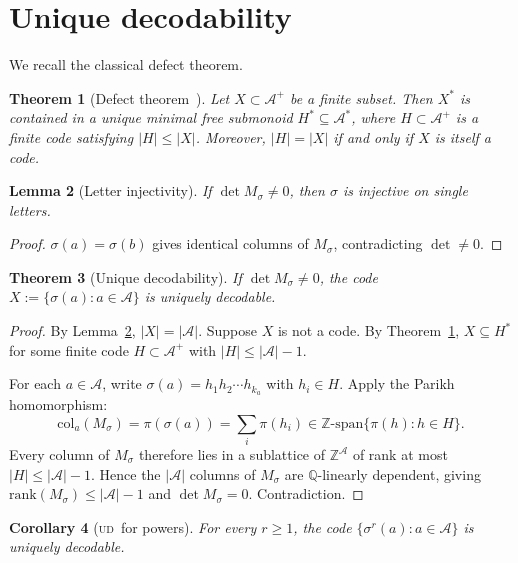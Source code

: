 \documentclass[11pt]{article}
\theoremstyle{plain}
\newtheorem{theorem}{Theorem}[section]
\newtheorem{lemma}[theorem]{Lemma}
\newtheorem{corollary}[theorem]{Corollary}
\theoremstyle{definition}
\theoremstyle{remark}
\newcommand{\UD}{\textsc{ud}}
\newcommand{\Z}{\mathbb{Z}}
\newcommand{\Q}{\mathbb{Q}}
\newcommand{\A}{\mathcal{A}}
\begin{document}
\section{Unique decodability}\label{sec:UD}

We recall the classical defect theorem.

\begin{theorem}[Defect theorem~\cite{BPPR,BPR}]\label{thm:defect}
Let $X\subset\A^+$ be a finite subset. Then $X^*$ is contained in a unique minimal free submonoid $H^*\subseteq\A^*$, where $H\subset\A^+$ is a finite code satisfying $|H|\le|X|$. Moreover, $|H|=|X|$ if and only if $X$ is itself a code.
\end{theorem}

\begin{lemma}[Letter injectivity]\label{lem:letter-inj}
If $\det M_\sigma\ne 0$, then $\sigma$ is injective on single letters.
\end{lemma}

\begin{proof}
$\sigma(a)=\sigma(b)$ gives identical columns of $M_\sigma$, contradicting $\det\ne 0$.
\end{proof}

\begin{theorem}[Unique decodability]\label{thm:UD}
If $\det M_\sigma\ne 0$, the code $X:=\{\sigma(a):a\in\A\}$ is uniquely decodable.
\end{theorem}

\begin{proof}
By Lemma~\ref{lem:letter-inj}, $|X|=|\A|$. Suppose $X$ is not a code. By Theorem~\ref{thm:defect}, $X\subseteq H^*$ for some finite code $H\subset\A^+$ with $|H|\le|\A|-1$.

For each $a\in\A$, write $\sigma(a)=h_1h_2\cdots h_{k_a}$ with $h_i\in H$. Apply the Parikh homomorphism:
\[
\mathrm{col}_a(M_\sigma)=\pi(\sigma(a))=\sum_i\pi(h_i)\in\Z\text{-span}\{\pi(h):h\in H\}.
\]
Every column of $M_\sigma$ therefore lies in a sublattice of $\Z^\A$ of rank at most $|H|\le|\A|-1$. Hence the $|\A|$ columns of $M_\sigma$ are $\Q$-linearly dependent, giving $\mathrm{rank}(M_\sigma)\le|\A|-1$ and $\det M_\sigma=0$. Contradiction.
\end{proof}

\begin{corollary}[\UD\ for powers]\label{cor:UD-powers}
For every $r\ge 1$, the code $\{\sigma^r(a):a\in\A\}$ is uniquely decodable.
\end{corollary}
\end{document}

